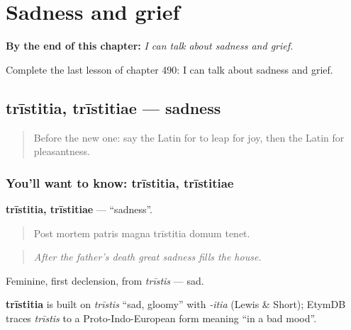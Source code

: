 
\chapter{Sadness and grief}
\label{ch:la-sadness-and-grief}

\begin{chapteropening}
\textbf{By the end of this chapter:} \emph{I can talk about sadness and grief.}

Complete the last lesson of chapter 490: I can talk about sadness and grief.
\end{chapteropening}

\section[trīstitia, trīstitiae]{trīstitia, trīstitiae — sadness}

\label{lesson:LA-C490-tristitia}



\begin{quote}
Before the new one: say the Latin for to leap for joy, then the Latin for pleasantness.
\end{quote}

\subsection*{You'll want to know: trīstitia, trīstitiae}
\textbf{trīstitia, trīstitiae} — \textquotedblleft{}sadness\textquotedblright{}.

\begin{quote}
Post mortem patris magna trīstitia domum tenet.
\end{quote}

\begin{quote}
\emph{After the father's death great sadness fills the house.}
\end{quote}

Feminine, first declension, from \emph{trīstis} — sad.

\begin{cousinweb}
\textbf{trīstitia} is built on \emph{trīstis} \textquotedblleft{}sad, gloomy\textquotedblright{} with \emph{-itia} (Lewis \& Short); EtymDB traces \emph{trīstis} to a Proto-Indo-European form meaning \textquotedblleft{}in a bad mood\textquotedblright{}.
\end{cousinweb}


